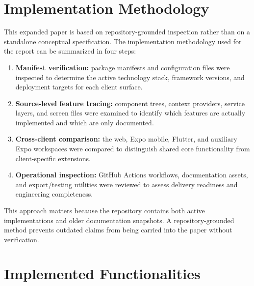 \documentclass[conference]{IEEEtran}
\begin{document}
\section{Implementation Methodology}
This expanded paper is based on repository-grounded inspection rather than on a standalone conceptual specification. The implementation methodology used for the report can be summarized in four steps:
\begin{enumerate}
\item \textbf{Manifest verification:} package manifests and configuration files were inspected to determine the active technology stack, framework versions, and deployment targets for each client surface.
\item \textbf{Source-level feature tracing:} component trees, context providers, service layers, and screen files were examined to identify which features are actually implemented and which are only documented.
\item \textbf{Cross-client comparison:} the web, Expo mobile, Flutter, and auxiliary Expo workspaces were compared to distinguish shared core functionality from client-specific extensions.
\item \textbf{Operational inspection:} GitHub Actions workflows, documentation assets, and export/testing utilities were reviewed to assess delivery readiness and engineering completeness.
\end{enumerate}

This approach matters because the repository contains both active implementations and older documentation snapshots. A repository-grounded method prevents outdated claims from being carried into the paper without verification.

\section{Implemented Functionalities}
\end{document}
